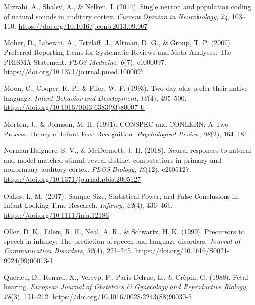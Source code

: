 \documentclass[
  english,
  man]{apa6}
\newlength{\cslhangindent}
\newlength{\cslentryspacingunit} %
\newenvironment{CSLReferences}[2] %
 {%
  \setlength{\parindent}{0pt}
  \ifodd #1
  \let\oldpar\par
  \def\par{\hangindent=\cslhangindent\oldpar}
  \fi
  \setlength{\parskip}{#2\cslentryspacingunit}
 }%
 {}
\begin{document}
\begin{CSLReferences}{1}{0}
\leavevmode{}%
Mizrahi, A., Shalev, A., \& Nelken, I. (2014). Single neuron and population coding of natural sounds in auditory cortex. \emph{Current Opinion in Neurobiology}, \emph{24}, 103--110. \url{https://doi.org/10.1016/j.conb.2013.09.007}

\leavevmode{}%
Moher, D., Liberati, A., Tetzlaff, J., Altman, D. G., \& Group, T. P. (2009). Preferred {Reporting} {Items} for {Systematic} {Reviews} and {Meta}-{Analyses}: {The} {PRISMA} {Statement}. \emph{PLOS Medicine}, \emph{6}(7), e1000097. \url{https://doi.org/10.1371/journal.pmed.1000097}

\leavevmode{}%
Moon, C., Cooper, R. P., \& Fifer, W. P. (1993). Two-day-olds prefer their native language. \emph{Infant Behavior and Development}, \emph{16}(4), 495--500. \url{https://doi.org/10.1016/0163-6383(93)80007-U}

\leavevmode{}%
Morton, J., \& Johnson, M. H. (1991). {CONSPEC} and {CONLERN}: {A} {Two}-{Process} {Theory} of {Infant} {Face} {Recognition}. \emph{Psychological Review}, \emph{98}(2), 164--181.

\leavevmode{}%
Norman-Haignere, S. V., \& McDermott, J. H. (2018). Neural responses to natural and model-matched stimuli reveal distinct computations in primary and nonprimary auditory cortex. \emph{PLOS Biology}, \emph{16}(12), e2005127. \url{https://doi.org/10.1371/journal.pbio.2005127}

\leavevmode{}%
Oakes, L. M. (2017). Sample {Size}, {Statistical} {Power}, and {False} {Conclusions} in {Infant} {Looking}-{Time} {Research}. \emph{Infancy}, \emph{22}(4), 436--469. \url{https://doi.org/10.1111/infa.12186}

\leavevmode{}%
Oller, D. K., Eilers, R. E., Neal, A. R., \& Schwartz, H. K. (1999). Precursors to speech in infancy: {The} prediction of speech and language disorders. \emph{Journal of Communication Disorders}, \emph{32}(4), 223--245. \url{https://doi.org/10.1016/S0021-9924(99)00013-1}

\leavevmode{}%
Querleu, D., Renard, X., Versyp, F., Paris-Delrue, L., \& Crèpin, G. (1988). Fetal hearing. \emph{European Journal of Obstetrics \& Gynecology and Reproductive Biology}, \emph{28}(3), 191--212. \url{https://doi.org/10.1016/0028-2243(88)90030-5}


\end{CSLReferences}
\end{document}
